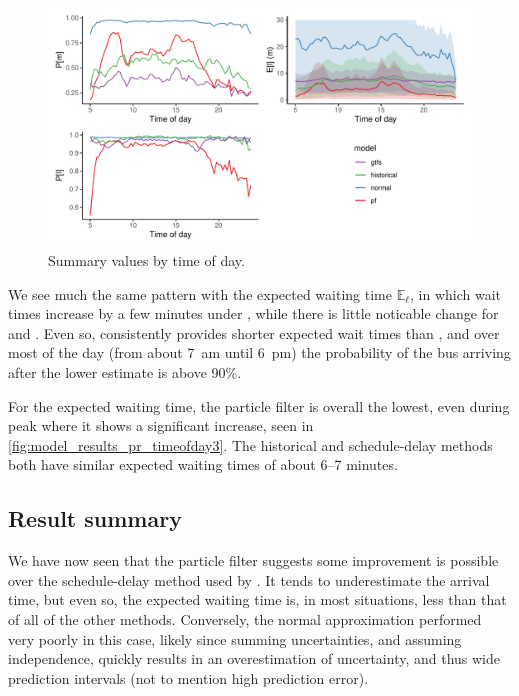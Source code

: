 \begin{knitrout}\small
{}\color{fgcolor}\begin{figure}
\includegraphics[width=\textwidth]{figure/model_results_pr_timeofday-1} \caption[Summary values by time of day]{Summary values by time of day.}\label{fig:model_results_pr_timeofday}
\end{figure}


\end{knitrout}


We see much the same pattern with the expected waiting time $\mathbb{E}_\ell$, in which wait times increase by a few minutes under \Fpf{}, while there is little noticable change for \Fsched{} and \Fhist{}. Even so, \Fpf{} consistently provides shorter expected wait times than \Fsched{}, and over most of the day (from about 7~am until 6~pm) the probability of the bus arriving after the lower estimate is above 90\%.

For the expected waiting time, the particle filter is overall the lowest, even during peak where it shows a significant increase, seen in \cref{fig:model_results_pr_timeofday3}. The historical and schedule-delay methods both have similar expected waiting times of about 6--7 minutes.


\subsection{Result summary}
\label{sec:prediction_model_comp_summary}

We have now seen that the particle filter suggests some improvement is possible over the schedule-delay method used by \AT. It tends to underestimate the arrival time, but even so, the expected waiting time is, in most situations, less than that of all of the other methods. Conversely, the normal approximation performed very poorly in this case, likely since summing uncertainties, and assuming independence, quickly results in an overestimation of uncertainty, and thus wide prediction intervals (not to mention high prediction error).

